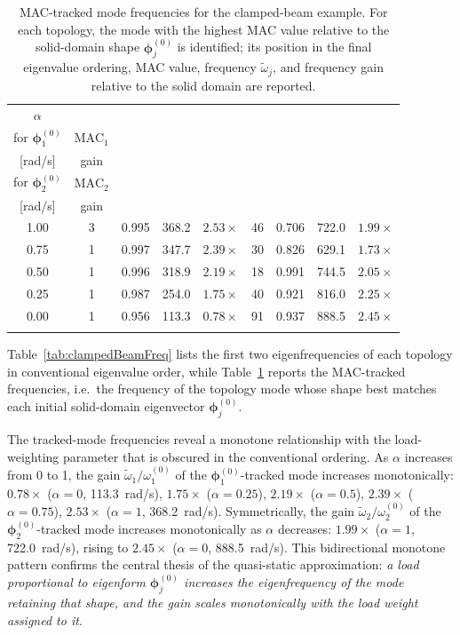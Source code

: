 \documentclass[pdflatex,lineno,sn-mathphys-ay]{sn-jnl}
\begin{document}
\begin{table}[htbp]
\centering
\caption{MAC-tracked mode frequencies for the clamped-beam example. For each topology, the mode with the highest MAC value relative to the solid-domain shape $\boldsymbol{\phi}_j^{(0)}$ is identified; its position in the final eigenvalue ordering, MAC value, frequency $\tilde{\omega}_j$, and frequency gain relative to the solid domain are reported.}
\label{tab:clampedBeamMAC}
\setlength{\tabcolsep}{3pt}
\renewcommand\arraystretch{1.1}
\footnotesize
\begin{tabular*}{\textwidth}{@{\extracolsep{\fill}}ccccccccc}
\Xhline{1.2pt}
$\alpha$ & \makecell{MAC-best mode\\for $\boldsymbol{\phi}_1^{(0)}$} & $\mathrm{MAC}_1$ & \makecell{$\tilde{\omega}_1$\\{[rad/s]}} & gain & \makecell{MAC-best mode\\for $\boldsymbol{\phi}_2^{(0)}$} & $\mathrm{MAC}_2$ & \makecell{$\tilde{\omega}_2$\\{[rad/s]}} & gain \\
\Xhline{1.2pt}
1.00 & 3 & 0.995 & 368.2 & $2.53\times$ & 46 & 0.706 & 722.0 & $1.99\times$ \\
0.75 & 1 & 0.997 & 347.7 & $2.39\times$ & 30 & 0.826 & 629.1 & $1.73\times$ \\
0.50 & 1 & 0.996 & 318.9 & $2.19\times$ & 18 & 0.991 & 744.5 & $2.05\times$ \\
0.25 & 1 & 0.987 & 254.0 & $1.75\times$ & 40 & 0.921 & 816.0 & $2.25\times$ \\
0.00 & 1 & 0.956 & 113.3 & $0.78\times$ & 91 & 0.937 & 888.5 & $2.45\times$ \\
\Xhline{1.2pt}
\end{tabular*}
\end{table}

Table~\ref{tab:clampedBeamFreq} lists the first two eigenfrequencies of each topology in conventional eigenvalue order, while Table~\ref{tab:clampedBeamMAC} reports the MAC-tracked frequencies, i.e.\ the frequency of the topology mode whose shape best matches each initial solid-domain eigenvector $\boldsymbol{\phi}_j^{(0)}$.

The tracked-mode frequencies reveal a monotone relationship with the load-weighting parameter that is obscured in the conventional ordering. As $\alpha$ increases from 0 to 1, the gain $\tilde{\omega}_1/\omega_1^{(0)}$ of the $\boldsymbol{\phi}_1^{(0)}$-tracked mode increases monotonically: $0.78\times$ ($\alpha=0$, 113.3~rad/s), $1.75\times$ ($\alpha=0.25$), $2.19\times$ ($\alpha=0.5$), $2.39\times$ ($\alpha=0.75$), $2.53\times$ ($\alpha=1$, 368.2~rad/s). Symmetrically, the gain $\tilde{\omega}_2/\omega_2^{(0)}$ of the $\boldsymbol{\phi}_2^{(0)}$-tracked mode increases monotonically as $\alpha$ decreases: $1.99\times$ ($\alpha=1$, 722.0~rad/s), rising to $2.45\times$ ($\alpha=0$, 888.5~rad/s). This bidirectional monotone pattern confirms the central thesis of the quasi-static approximation: \emph{a load proportional to eigenform $\boldsymbol{\phi}_j^{(0)}$ increases the eigenfrequency of the mode retaining that shape, and the gain scales monotonically with the load weight assigned to it}.
\end{document}
